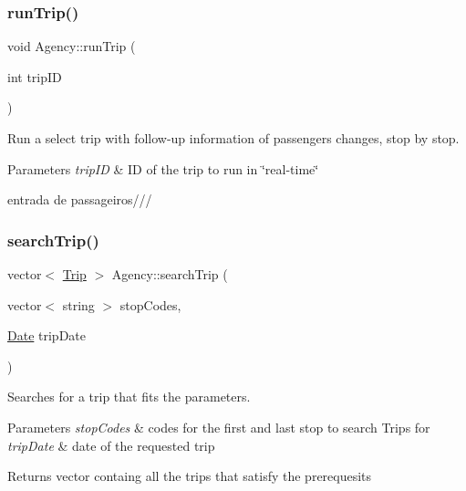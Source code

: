 \subsubsection{\texorpdfstring{run\+Trip()}{runTrip()}}
{\footnotesize\ttfamily void Agency\+::run\+Trip (\begin{DoxyParamCaption}\item[{int}]{trip\+ID }\end{DoxyParamCaption})}



Run a select trip with follow-\/up information of passengers changes, stop by stop. 


\begin{DoxyParams}{Parameters}
{\em trip\+ID} & ID of the trip to run in \char`\"{}real-\/time\char`\"{} \\
\hline
\end{DoxyParams}
entrada de passageiros/// \mbox{\label{group___agency_ga7ec6b058801f49850148979c1a41554a}} 
\subsubsection{\texorpdfstring{search\+Trip()}{searchTrip()}}
{\footnotesize\ttfamily vector$<$ \hyperlink{class_trip}{Trip} $>$ Agency\+::search\+Trip (\begin{DoxyParamCaption}\item[{vector$<$ string $>$}]{stop\+Codes,  }\item[{\hyperlink{class_date}{Date}}]{trip\+Date }\end{DoxyParamCaption})}



Searches for a trip that fits the parameters. 


\begin{DoxyParams}{Parameters}
{\em stop\+Codes} & codes for the first and last stop to search Trips for \\
\hline
{\em trip\+Date} & date of the requested trip\\
\hline
\end{DoxyParams}
\begin{DoxyReturn}{Returns}
vector containg all the trips that satisfy the prerequesits 
\end{DoxyReturn}
\mbox{\label{group___agency_gabc352c6cad4e22817e2a52a0e756e295}} 
